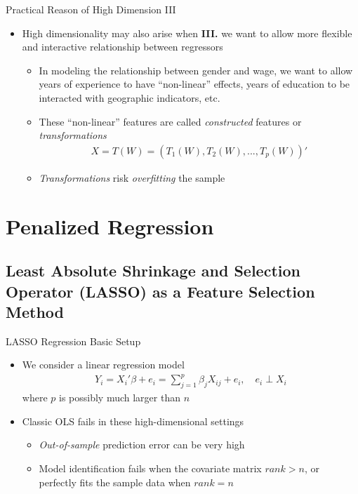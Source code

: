 \documentclass[aspectratio=1610,12pt,xcolor=dvipsnames]{beamer}
\begin{document}
\begin{frame}{Practical Reason of High Dimension III}

\begin{itemize}
    \item High dimensionality may also arise when \textbf{III.} we want to allow more flexible and interactive relationship between regressors
    \begin{itemize}
        \item In modeling the relationship between gender and wage, we want to allow years of experience to have ``non-linear'' effects, years of education to be interacted with geographic indicators, etc.
        \item These ``non-linear'' features are called \textit{constructed} features or \textit{transformations}
        \begin{align*}
            X = T(W) = (T_1(W), T_2(W), ...,T_p(W))'
        \end{align*}
        \item \textit{Transformations} risk \textit{overfitting} the sample
    \end{itemize}
\end{itemize}
\end{frame}

\section{Penalized Regression}

\subsection{Least Absolute Shrinkage and Selection Operator (LASSO) as a Feature Selection Method}

\begin{frame}
  \subsectionpage
\end{frame}

\begin{frame}{LASSO Regression Basic Setup}

\begin{itemize}
    \item We consider a linear regression model
    \begin{align*}
        Y_i = X_i'\beta +e_i = \sum_{j=1}^{p}\beta_jX_{ij} + e_i, \quad e_i \perp X_i
    \end{align*}
    where $p$ is possibly much larger than $n$
    \item Classic OLS fails in these high-dimensional settings
    \begin{itemize}
        \item \textit{Out-of-sample} prediction error can be very high
        \item Model identification fails when the covariate matrix $rank>n$, or perfectly fits the sample data when $rank=n$
    \end{itemize}
\end{itemize}
\end{frame}
\end{document}
